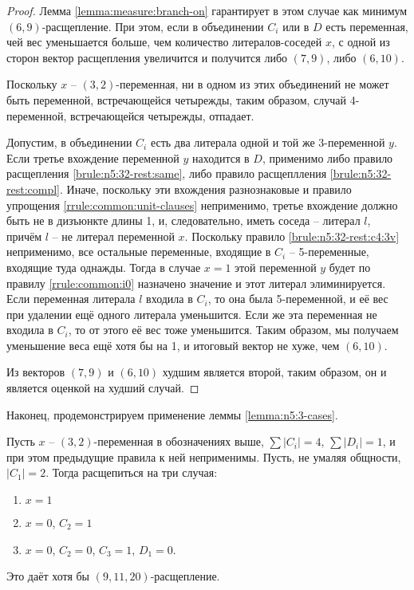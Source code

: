 \begin{proof}
 Лемма \ref{lemma:measure:branch-on} гарантирует в этом случае как минимум $(6,9)$-расщепление. При этом, если в объединении $C_i$ или в $D$ есть переменная, чей вес уменьшается больше, чем количество литералов-соседей $x$, с одной из сторон вектор расщепления увеличится и получится либо $(7,9)$, либо $(6,10)$.

 Поскольку $x$ -- $(3,2)$-переменная, ни в одном из этих объединений не может быть переменной, встречающейся четырежды, таким образом, случай 4-переменной, встречающейся четырежды, отпадает.

 Допустим, в объединении $C_i$ есть два литерала одной и той же 3-переменной $y$. Если третье вхождение переменной $y$ находится в $D$, применимо либо правило расщепления \ref{brule:n5:32-rest:same}, либо правило расщеплления \ref{brule:n5:32-rest:compl}. Иначе, поскольку эти вхождения разнознаковые и правило упрощения \ref{rrule:common:unit-clauses} неприменимо, третье вхождение должно быть не в дизъюнкте длины 1, и, следовательно, иметь соседа -- литерал $l$, причём $l$ -- не литерал переменной $x$. Поскольку правило \ref{brule:n5:32-rest:c4:3v} неприменимо, все остальные переменные, входящие в $C_i$ -- 5-переменные, входящие туда однажды. Тогда в случае $x = 1$ этой переменной $y$ будет по правилу \ref{rrule:common:i0} назначено значение и этот литерал элиминируется. Если переменная литерала $l$ входила в $C_i$, то она была 5-переменной, и её вес при удалении ещё одного литерала уменьшится. Если же эта переменная не входила в $C_i$, то от этого её вес тоже уменьшится. Таким образом, мы получаем уменьшение веса ещё хотя бы на 1, и итоговый вектор не хуже, чем $(6,10)$.

 Из векторов $(7,9)$ и $(6,10)$ худшим является второй, таким образом, он и является оценкой на худший случай.
\end{proof}

Наконец, продемонстрируем применение леммы \ref{lemma:n5:3-cases}.

\begin{brule}
 Пусть $x$ -- $(3,2)$-переменная в обозначениях выше, $\sum |C_i| = 4$, $\sum |D_i| = 1$, и при этом предыдущие правила к ней неприменимы. Пусть, не умаляя общности, $|C_1| = 2$. Тогда расщепиться на три случая:

 \begin{enumerate}
  \item $x = 1$
  \item $x = 0$, $C_2 = 1$
  \item $x = 0$, $C_2 = 0$, $C_3 = 1$, $D_1 = 0$.
 \end{enumerate}

 Это даёт хотя бы $(9,11,20)$-расщепление.
 \label{brule:n5:32-rest:c4:3-cases}
\end{brule}

